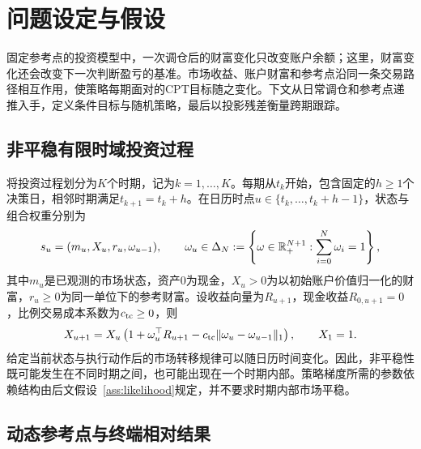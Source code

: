 \chapter{问题设定与假设}\label{sec:setup}

固定参考点的投资模型中，一次调仓后的财富变化只改变账户余额；这里，财富变化还会改变下一次判断盈亏的基准。市场收益、账户财富和参考点沿同一条交易路径相互作用，使策略每期面对的CPT目标随之变化。下文从日常调仓和参考点递推入手，定义条件目标与随机策略，最后以投影残差衡量跨期跟踪。

\section{非平稳有限时域投资过程}

将投资过程划分为$K$个时期，记为$k=1,\ldots,K$。每期从$t_k$开始，包含固定的$h\ge1$个决策日，相邻时期满足$t_{k+1}=t_k+h$。在日历时点$u\in\{t_k,\ldots,t_k+h-1\}$，状态与组合权重分别为
\begin{equation}\label{eq:state-action}
 s_u=(m_u,X_u,r_u,\omega_{u-1}),
 \qquad
 \omega_u\in\Delta_N:=\left\{\omega\in\mathbb R_+^{N+1}:\sum_{i=0}^{N}\omega_i=1\right\},
\end{equation}
其中$m_u$是已观测的市场状态，资产$0$为现金，$X_u>0$为以初始账户价值归一化的财富，$r_u\ge0$为同一单位下的参考财富。设收益向量为$R_{u+1}$，现金收益$R_{0,u+1}=0$，比例交易成本系数为$c_{\rm tc}\ge0$，则
\begin{equation}\label{eq:wealth-update}
 X_{u+1}=X_u\left(1+\omega_u^\top R_{u+1}
 -c_{\rm tc}\lVert\omega_u-\omega_{u-1}\rVert_1\right),
 \qquad X_1=1.
\end{equation}
给定当前状态与执行动作后的市场转移规律可以随日历时间变化。因此，非平稳性既可能发生在不同时期之间，也可能出现在一个时期内部。策略梯度所需的参数依赖结构由后文假设~\ref{ass:likelihood}规定，并不要求时期内部市场平稳。

\section{动态参考点与终端相对结果}

